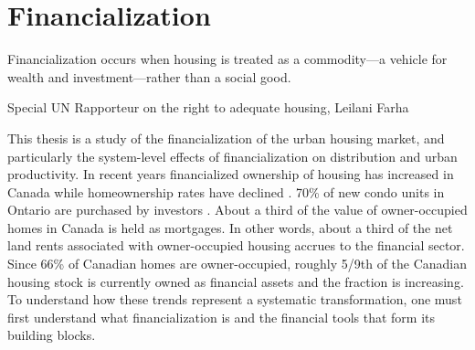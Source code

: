 \chapter{Financialization} \label{chapter-financialization}
\epigraph{Financialization occurs when housing is treated as a commodity---a vehicle for wealth and investment---rather than a social good.}{Special UN Rapporteur on the right to adequate housing, Leilani Farha \cite{farhaReportFinancializationHousing2017}}



This thesis is a study of the \gls{financialization} of the urban housing market, and particularly the system-level effects of financialization on distribution and urban productivity.  In recent years financialized ownership of housing has increased in Canada while homeownership rates have declined \cite{statisticscanadaBuyRentHousing2022}.
70\% of new condo units in Ontario are purchased by investors \cite{pickelInvestorsOwn772023}.  About a third of the value of owner-occupied homes in Canada is held as mortgages. In other words, about a third of the net land rents associated with owner-occupied housing accrues to the financial sector. Since 66\% of Canadian homes are owner-occupied, roughly 5/9th of the Canadian housing stock is currently owned as financial assets \cite{nemtinFinancializationHousingSocial2021} and the fraction is increasing. %
To understand how these trends represent a systematic transformation,  one must first understand what financialization is and the financial tools that form its building blocks. 

